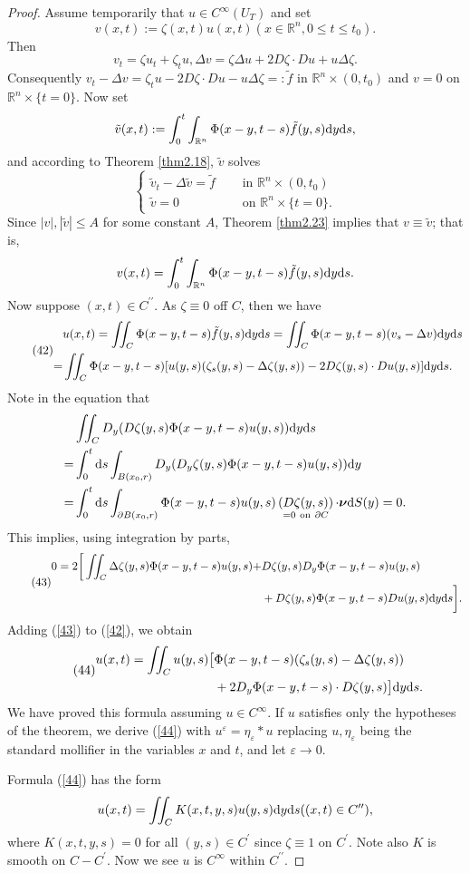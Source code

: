 \documentclass[hyperref,UTF8,12pt]{article}
\numberwithin{equation}{subsection}
\theoremstyle{plain}
\theoremstyle{definition}
\numberwithin{theorem}{section}
\numberwithin{lemma}{section}
\numberwithin{proposition}{section}
\numberwithin{remark}{section}
\numberwithin{corollary}{section}
\numberwithin{definition}{section}
\numberwithin{problem}{section}
\numberwithin{example}{section}
\def\dif{\textup{d}}
\newcommand{\ptl}{\partial}
\newcommand{\mr}{\mathbb{R}}
\renewcommand{\leq}{\leqslant}
\newcommand{\ve}{\varepsilon}
\begin{document}
\begin{proof}
Assume temporarily that $u\in C^\infty(U_T)$ and set
\[v(x,t):=\zeta(x,t)u(x,t)(x\in\mr^n,0\leq t\leq t_0).\]Then
\[v_t=\zeta u_t+\zeta_tu,\Delta v=\zeta\Delta u+2D\zeta\cdot Du+u\Delta\zeta.\]
Consequently $v_t-\Delta v=\zeta_t u-2D\zeta\cdot Du-u\Delta\zeta=:\tilde{f}$ in $\mr^n \times(0,t_0)$ and $v=0$ on $\mr^n\times\{t=0\}$. Now set \[\tilde{v}(x,t):=\int_0^t\int_{\mr^n}\Phi(x-y,t-s)\tilde{f}(y,s)\dif y\dif s,\]and according to Theorem \ref{thm2.18}, $\tilde{v}$ solves \[\left\{\begin{aligned}
	\tilde{v}_t-\Delta\tilde{v}=\tilde{f}&\quad\text{ in } \mr^n\times(0,t_0)\\
	\tilde{v}=0&\quad\text{ on } \mr^n \times\{t=0\}.
\end{aligned}\right.\]Since $|v|,|\tilde{v}|\leq A$ for some constant $A$, Theorem \ref{thm2.23} implies that $v\equiv\tilde{v}$; that is, \[v(x,t)=\int_0^t\int_{\mr^n}\Phi(x-y,t-s)\tilde{f}(y,s)\dif y\dif s.\]
Now suppose $(x,t)\in C^{\prime\prime}$. As $\zeta\equiv0$ off $C$, then we have \[\tag{42}\label{42}\begin{aligned}
	&u(x,t)=\iint_C\Phi(x-y,t-s)\tilde{f}(y,s)\dif y\dif s=\iint_C\Phi(x-y,t-s)(v_s-\Delta v)\dif y\dif s\\
	=&\iint_C\Phi(x-y,t-s)[u(y,s)(\zeta_s(y,s)-\Delta\zeta(y,s))-2D\zeta(y,s)\cdot Du(y,s)]\dif y\dif s.
\end{aligned}\]Note in the equation that \[\begin{aligned}
&\iint_CD_y(D\zeta(y,s)\Phi(x-y,t-s)u(y,s))\dif y\dif s\\
=&\int_0^t\dif s\int_{B(x_0,r)}D_y(D_y\zeta(y,s)\Phi(x-y,t-s)u(y,s))\dif y\\
=&\int_0^t\dif s\int_{\ptl B(x_0,r)}\Phi(x-y,t-s)u(y,s)\mathop{(D\zeta(y,s))}_{=0~ \text{on}~\ptl C}\cdot\bm{\nu}\dif S(y)=0.
\end{aligned}\]This implies, using integration by parts, \[\tag{43}\label{43}\begin{aligned}
0=2\bigg[\iint_C\Delta\zeta(y,s)\Phi(x-y,t-s)u(y,s)+&D\zeta(y,s)D_y\Phi(x-y,t-s)u(y,s)\\
&+D\zeta(y,s)\Phi(x-y,t-s)Du(y,s)\dif y\dif s\bigg].
\end{aligned}\]Adding (\ref{43}) to (\ref{42}), we obtain\[\tag{44}\label{44}\begin{aligned}
u(x,t)=\iint_Cu(y,s)\big[&\Phi(x-y, t-s)(\zeta_s(y,s)-\Delta\zeta(y,s))\\
&+2D_y\Phi(x-y,t-s)\cdot D\zeta(y,s)\big]\dif y\dif s.
\end{aligned}\]We have proved this formula assuming $u\in C^\infty$. If $u$ satisfies only the hypotheses of the theorem, we derive (\ref{44}) with $u^\ve=\eta_\ve*u$ replacing $u,\eta_\ve$ being the standard mollifier in the variables $x$ and $t$, and let $\ve\to0$.

Formula (\ref{44}) has the form
\[u(x,t)=\iint_CK(x,t,y,s)u(y,s)\dif y\dif s((x,t)\in C^{\prime\prime}),\]where $K(x,t,y,s)= 0$ for all $(y,s)\in C^\prime$ since $\zeta\equiv1$ on $C^\prime$. Note also $K$ is smooth on $C-C^\prime$. Now we see $u$ is $C^\infty$ within $C^{\prime\prime}$.
\end{proof}
\end{document}
